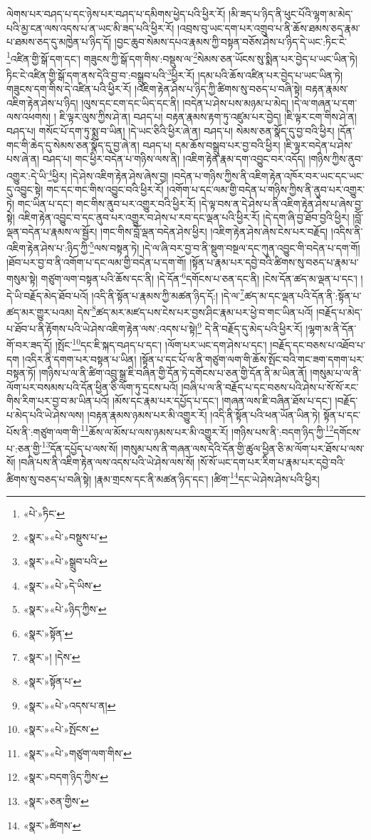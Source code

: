 ལེགས་པར་བཤད་པ་དང་ཉེས་པར་བཤད་པ་དམིགས་ཕྱེད་པའི་ཕྱིར་རོ། །མི་ཟད་པ་ཉིད་ནི་ཕུང་པོའི་ལྷག་མ་མེད་པའི་མྱ་ངན་ལས་འདས་པ་ན་ཡང་མི་ཟད་པའི་ཕྱིར་རོ། །འབྲས་བུ་ཡང་དག་པར་འགྲུབ་པ་ནི་ཆོས་ཐམས་ཅད་རྣམ་པ་ཐམས་ཅད་དུ་མཁྱེན་པ་ཉིད་དོ། །བྱང་ཆུབ་སེམས་དཔའ་རྣམས་ཀྱི་བསྟན་བཅོས་ཤེས་པ་ཉིད་དེ་ཡང་:ཏིང་ངེ་\footnote{«པེ་»ཏིང་}འཛིན་གྱི་སྒོ་དག་དང་། གཟུངས་ཀྱི་སྒོ་དག་གིས་:བསྡུས་ལ་\footnote{«སྣར་»«པེ་»བསྡུས་པ་}སེམས་ཅན་ཡོངས་སུ་སྨིན་པར་བྱེད་པ་ཡང་ཡིན་ཏེ། ཏིང་ངེ་འཛིན་གྱི་སྒོ་དག་ནས་དེའི་བྱ་བ་:བསྒྲུབ་པའི་\footnote{«སྣར་»«པེ་»སྒྲུབ་པའི་}ཕྱིར་རོ། །དམ་པའི་ཆོས་འཛིན་པར་བྱེད་པ་ཡང་ཡིན་ཏེ། གཟུངས་དག་གིས་དེ་འཛིན་པའི་ཕྱིར་རོ། །འཇིག་རྟེན་ཤེས་པ་ཉིད་ཀྱི་ཚིགས་སུ་བཅད་པ་བཞི་སྟེ། བརྟན་རྣམས་འཇིག་རྟེན་ཤེས་པ་ཉིད། །ལུས་དང་ངག་དང་ཡིད་དང་ནི། །བདེན་པ་ཤེས་པས་མཉམ་པ་མེད། །དེ་ལ་གཞན་པ་དག་ལས་འཕགས། །
ཇི་ལྟར་ལུས་ཀྱིས་ཤེ་ན། བཤད་པ། བརྟན་རྣམས་རྟག་ཏུ་འཛུམ་པར་བྱེད། །ཇི་ལྟར་ངག་གིས་ཤེ་ན། བཤད་པ། གསོང་པོ་དག་ཏུ་སྨྲ་བ་ཡིན། །དེ་ཡང་ཅིའི་ཕྱིར་ཞེ་ན། བཤད་པ། སེམས་ཅན་སྣོད་དུ་བྱ་བའི་ཕྱིར། །དོན་གང་གི་ཆེད་དུ་སེམས་ཅན་སྣོད་དུ་བྱ་ཞེ་ན། བཤད་པ། དམ་ཆོས་བསྒྲུབ་པར་བྱ་བའི་ཕྱིར། །ཇི་ལྟར་བདེན་པ་ཤེས་པས་ཞེ་ན། བཤད་པ། གང་ཕྱིར་བདེན་པ་གཉིས་ལས་ནི། །འཇིག་རྟེན་རྣམ་དག་འབྱུང་བར་འདོད། །གཉིས་ཀྱིས་ནུབ་འགྱུར་:དེ་ཡི་\footnote{«སྣར་»«པེ་»དེ་ཡིས་}ཕྱིར། །དེ་ཤེས་འཇིག་རྟེན་ཤེས་ཞེས་བྱ། །བདེན་པ་གཉིས་ཀྱིས་ནི་འཇིག་རྟེན་འཁོར་བར་ཡང་དང་ཡང་དུ་འབྱུང་སྟེ། གང་དང་གང་གིས་འབྱུང་བའི་ཕྱིར་རོ། །འགོག་པ་དང་ལམ་གྱི་བདེན་པ་གཉིས་ཀྱིས་ནི་ནུབ་པར་འགྱུར་ཏེ། གང་ཡིན་པ་དང་། གང་གིས་ནུབ་པར་འགྱུར་བའི་ཕྱིར་རོ། །དེ་ལྟ་བས་ན་དེ་ཤེས་པ་ནི་འཇིག་རྟེན་ཤེས་པ་ཞེས་བྱ་སྟེ། འཇིག་རྟེན་འབྱུང་བ་དང་ནུབ་པར་འགྱུར་བ་ཤེས་པ་རབ་དང་ལྡན་པའི་ཕྱིར་རོ། །དེ་དག་ཞི་བྱ་ཐོབ་བྱའི་ཕྱིར། །བློ་ལྡན་བདེན་པ་རྣམས་ལ་སྦྱོར། །གང་གིས་བློ་ལྡན་བདེན་ཤེས་ཕྱིར། །འཇིག་རྟེན་ཤེས་ཞེས་ངེས་པར་བརྗོད། །འདིས་ནི་འཇིག་རྟེན་ཤེས་པ་:ཉིད་ཀྱི་\footnote{«སྣར་»«པེ་»ཉིད་ཀྱིས་}ལས་བསྟན་ཏེ། །དེ་ལ་ཞི་བར་བྱ་བ་ནི་སྡུག་བསྔལ་དང་ཀུན་འབྱུང་གི་བདེན་པ་དག་གོ། །ཐོབ་པར་བྱ་བ་ནི་འགོག་པ་དང་ལམ་གྱི་བདེན་པ་དག་གོ། །སྟོན་པ་རྣམ་པར་དབྱེ་བའི་ཚིགས་སུ་བཅད་པ་རྣམ་པ་གསུམ་སྟེ། གཙུག་ལག་བསྟན་པའི་ཆོས་དང་ནི། །དེ་དོན་\footnote{«སྣར་»སྟོན་}དགོངས་པ་ཅན་དང་ནི། །ངེས་དོན་ཚད་མ་ལྡན་པ་དང་། །དེ་ཡི་བརྗོད་མེད་ཐོབ་པའོ། །འདི་ནི་སྟོན་པ་རྣམས་ཀྱི་མཚན་ཉིད་དོ:། །དེ་ལ་\footnote{«སྣར་»། །དེས་}ཚད་མ་དང་ལྡན་པའི་དོན་ནི་:སྟོན་པ་ཚད་མར་གྱུར་པའམ། དེས་\footnote{«སྣར་»སྟོན་པ་}ཚད་མར་མཛད་པས་ངེས་པར་བྱས་ཤིང་རྣམ་པར་ཕྱེ་བ་གང་ཡིན་པའོ། །བརྗོད་པ་མེད་པ་ཐོབ་པ་ནི་རྟོགས་པའི་ཡེ་ཤེས་འཇིག་རྟེན་ལས་:འདས་པ་སྟེ།\footnote{«སྣར་»«པེ་»འདས་པ་ན།} དེ་ནི་བརྗོད་དུ་མེད་པའི་ཕྱིར་རོ། །ལྷག་མ་ནི་དོན་གོ་བར་ཟད་དོ། །སྤོང་\footnote{«སྣར་»«པེ་»སྤོངས་}དང་ཇི་སྐད་བཤད་པ་དང་། །ལོག་པར་ཡང་དག་ཤེས་པ་དང་། །བརྗོད་དང་བཅས་པ་འཐོབ་པ་དག །འདིར་ནི་དགག་པར་བསྟན་པ་ཡིན། །སྟོན་པ་དང་པོ་ལ་ནི་གཙུག་ལག་གི་ཆོས་སྤོང་བའི་གང་ཟག་དགག་པར་བསྟན་ཏོ། །གཉིས་པ་ལ་ནི་ཚིག་འབྲུ་སྒྲ་ཇི་བཞིན་གྱི་དོན་ཏེ་དགོངས་པ་ཅན་གྱི་དོན་ནི་མ་ཡིན་ནོ། །གསུམ་པ་ལ་ནི་ལོག་པར་བསམས་པའི་དོན་ཕྱིན་ཅི་ལོག་ཏུ་དྲངས་པའོ། །བཞི་པ་ལ་ནི་བརྗོད་པ་དང་བཅས་པའི་ཤེས་པ་སོ་སོ་རང་གིས་རིག་པར་བྱ་བ་མ་ཡིན་པའོ། །མོས་དང་རྣམ་པར་དཔྱོད་པ་དང་། །གཞན་ལས་ཇི་བཞིན་ཐོས་པ་དང་། །བརྗོད་པ་མེད་པའི་ཡེ་ཤེས་ལས། །བརྟན་རྣམས་ཉམས་པར་མི་འགྱུར་རོ། །འདི་ནི་སྟོན་པའི་ཕན་ཡོན་ཡིན་ཏེ། སྟོན་པ་དང་པོས་ནི་:གཙུག་ལག་གི་\footnote{«སྣར་»«པེ་»གཙུག་ལག་གིས་}ཆོས་ལ་མོས་པ་ལས་ཉམས་པར་མི་འགྱུར་རོ། །གཉིས་པས་ནི་:བདག་ཉིད་ཀྱི་\footnote{«སྣར་»བདག་ཉིད་ཀྱིས་}དགོངས་པ་:ཅན་གྱི་\footnote{«སྣར་»ཅན་གྱིས་}དོན་དཔྱོད་པ་ལས་སོ། །གསུམ་པས་ནི་གཞན་ལས་དེའི་དོན་གྱི་ཚུལ་ཕྱིན་ཅི་མ་ལོག་པར་ཐོས་པ་ལས་སོ། །བཞི་པས་ནི་འཇིག་རྟེན་ལས་འདས་པའི་ཡེ་ཤེས་ལས་སོ། །སོ་སོ་ཡང་དག་པར་རིག་པ་རྣམ་པར་དབྱེ་བའི་ཚིགས་སུ་བཅད་པ་བཞི་སྟེ། །རྣམ་གྲངས་དང་ནི་མཚན་ཉིད་དང་། །ཚིག་\footnote{«སྣར་»ཚིགས་}དང་ཡེ་ཤེས་ཤེས་པའི་ཕྱིར། 